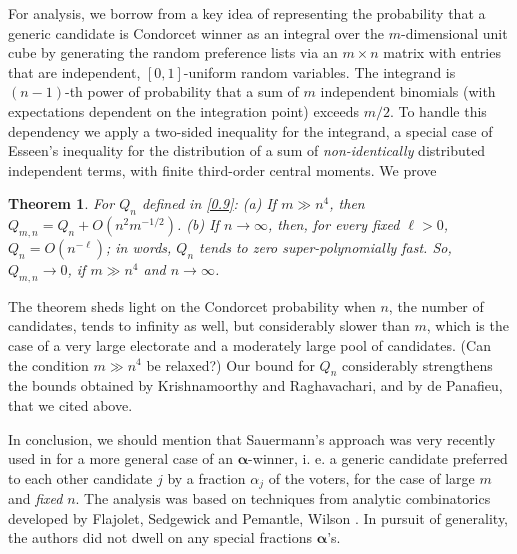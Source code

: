 \documentclass[11pt]{amsart}
\newtheorem{theorem}{Theorem}[section]
\def\a{\alpha}
\theoremstyle{remark}
\numberwithin{equation}{section}
\begin{document}
For analysis, we borrow from \cite{Sau} a key idea of representing the probability that a generic candidate is Condorcet winner as an integral over the $m$-dimensional unit cube by generating the random preference lists via an $m\times n$ matrix with entries that are independent, $[0,1]$-uniform random variables. The integrand is $(n-1)$-th power of probability that a sum of $m$  independent binomials 
(with expectations dependent on the integration point) exceeds $m/2$. To handle this dependency we apply a two-sided inequality for the integrand,  a special case of Esseen's inequality for the distribution of a sum of {\it non-identically\/} distributed independent terms, with finite third-order central moments. We prove

\begin{theorem}\label{newthm1} For $Q_n$ defined in \eqref{0.9}: 
(a) If $m\gg n^4$, then $Q_{m,n}=Q_n+O(n^2m^{-1/2})$. (b) If $n\to\infty$, then, for every {\it fixed} $\ell> 0$, $Q_n
=O(n^{-\ell})$; in words, $Q_n$ tends to zero super-polynomially fast. So, 
$Q_{m,n}\to 0$, if $m\gg n^4$ and $n\to\infty$.
\end{theorem}
\noindent
The theorem sheds light on the Condorcet probability when $n$, the number of candidates, tends to infinity as well, but considerably slower than $m$, which is the case of a very large electorate and a moderately large pool of candidates. (Can the condition $m\gg n^4$ be relaxed?)
Our bound for $Q_n$ considerably strengthens the bounds obtained by Krishnamoorthy and Raghavachari, and by de Panafieu, that we cited above.


In conclusion, we should mention that Sauermann's approach was very recently used in \cite{Cai} for a more general case of an $\boldsymbol{\a}$-winner, i. e. a generic candidate  preferred to each other candidate $j$ by a fraction $\a_j$ of the voters, for the case of large $m$ and {\it fixed\/} $n$. The analysis was based on techniques from analytic combinatorics developed by Flajolet, Sedgewick \cite{Fla} and Pemantle,
Wilson \cite{Pem}. In pursuit of generality, the authors did not dwell on any special fractions $\boldsymbol \a$'s.
\end{document}
